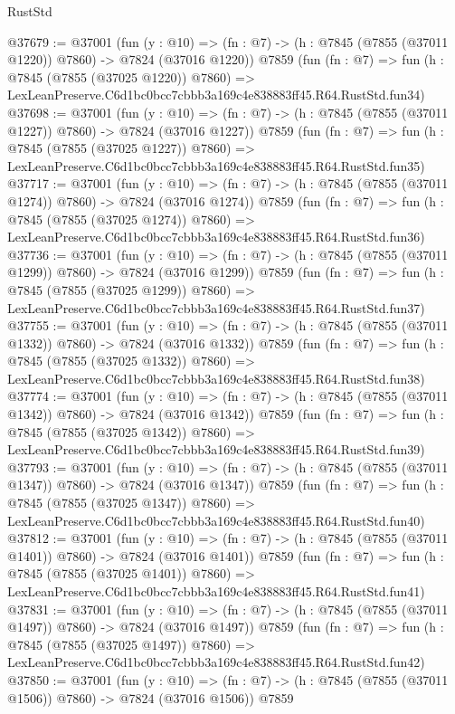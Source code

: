 \begin{lexlean}{RustStd}
\begin{coremodule}
@37679 := @37001
    (fun (y : @10) => (fn : @7) -> (h : @7845 (@7855 (@37011 @1220)) @7860) -> @7824 (@37016 @1220))
    @7859
    (fun (fn : @7) =>
    fun (h : @7845 (@7855 (@37025 @1220)) @7860) =>
    LexLeanPreserve.C6d1bc0bcc7cbbb3a169c4e838883ff45.R64.RustStd.fun34)
@37698 := @37001
    (fun (y : @10) => (fn : @7) -> (h : @7845 (@7855 (@37011 @1227)) @7860) -> @7824 (@37016 @1227))
    @7859
    (fun (fn : @7) =>
    fun (h : @7845 (@7855 (@37025 @1227)) @7860) =>
    LexLeanPreserve.C6d1bc0bcc7cbbb3a169c4e838883ff45.R64.RustStd.fun35)
@37717 := @37001
    (fun (y : @10) => (fn : @7) -> (h : @7845 (@7855 (@37011 @1274)) @7860) -> @7824 (@37016 @1274))
    @7859
    (fun (fn : @7) =>
    fun (h : @7845 (@7855 (@37025 @1274)) @7860) =>
    LexLeanPreserve.C6d1bc0bcc7cbbb3a169c4e838883ff45.R64.RustStd.fun36)
@37736 := @37001
    (fun (y : @10) => (fn : @7) -> (h : @7845 (@7855 (@37011 @1299)) @7860) -> @7824 (@37016 @1299))
    @7859
    (fun (fn : @7) =>
    fun (h : @7845 (@7855 (@37025 @1299)) @7860) =>
    LexLeanPreserve.C6d1bc0bcc7cbbb3a169c4e838883ff45.R64.RustStd.fun37)
@37755 := @37001
    (fun (y : @10) => (fn : @7) -> (h : @7845 (@7855 (@37011 @1332)) @7860) -> @7824 (@37016 @1332))
    @7859
    (fun (fn : @7) =>
    fun (h : @7845 (@7855 (@37025 @1332)) @7860) =>
    LexLeanPreserve.C6d1bc0bcc7cbbb3a169c4e838883ff45.R64.RustStd.fun38)
@37774 := @37001
    (fun (y : @10) => (fn : @7) -> (h : @7845 (@7855 (@37011 @1342)) @7860) -> @7824 (@37016 @1342))
    @7859
    (fun (fn : @7) =>
    fun (h : @7845 (@7855 (@37025 @1342)) @7860) =>
    LexLeanPreserve.C6d1bc0bcc7cbbb3a169c4e838883ff45.R64.RustStd.fun39)
@37793 := @37001
    (fun (y : @10) => (fn : @7) -> (h : @7845 (@7855 (@37011 @1347)) @7860) -> @7824 (@37016 @1347))
    @7859
    (fun (fn : @7) =>
    fun (h : @7845 (@7855 (@37025 @1347)) @7860) =>
    LexLeanPreserve.C6d1bc0bcc7cbbb3a169c4e838883ff45.R64.RustStd.fun40)
@37812 := @37001
    (fun (y : @10) => (fn : @7) -> (h : @7845 (@7855 (@37011 @1401)) @7860) -> @7824 (@37016 @1401))
    @7859
    (fun (fn : @7) =>
    fun (h : @7845 (@7855 (@37025 @1401)) @7860) =>
    LexLeanPreserve.C6d1bc0bcc7cbbb3a169c4e838883ff45.R64.RustStd.fun41)
@37831 := @37001
    (fun (y : @10) => (fn : @7) -> (h : @7845 (@7855 (@37011 @1497)) @7860) -> @7824 (@37016 @1497))
    @7859
    (fun (fn : @7) =>
    fun (h : @7845 (@7855 (@37025 @1497)) @7860) =>
    LexLeanPreserve.C6d1bc0bcc7cbbb3a169c4e838883ff45.R64.RustStd.fun42)
@37850 := @37001
    (fun (y : @10) => (fn : @7) -> (h : @7845 (@7855 (@37011 @1506)) @7860) -> @7824 (@37016 @1506))
    @7859

\end{coremodule}
\end{lexlean}
